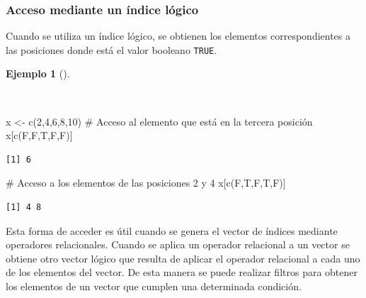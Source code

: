 \documentclass[
  a4paper,
]{scrreport}
\newenvironment{Shaded}{\begin{snugshade}}{\end{snugshade}}
\newcommand{\CommentTok}[1]{\textcolor[rgb]{0.37,0.37,0.37}{#1}}
\newcommand{\DecValTok}[1]{\textcolor[rgb]{0.68,0.00,0.00}{#1}}
\newcommand{\FunctionTok}[1]{\textcolor[rgb]{0.28,0.35,0.67}{#1}}
\newcommand{\NormalTok}[1]{\textcolor[rgb]{0.00,0.23,0.31}{#1}}
\newcommand{\OtherTok}[1]{\textcolor[rgb]{0.00,0.23,0.31}{#1}}
\theoremstyle{definition}
\theoremstyle{definition}
\newtheorem{example}{Ejemplo}[chapter]
\theoremstyle{remark}
\begin{document}
\hypertarget{acceso-mediante-un-uxedndice-luxf3gico}{%
\subsubsection{Acceso mediante un índice
lógico}\label{acceso-mediante-un-uxedndice-luxf3gico}}

Cuando se utiliza un índice lógico, se obtienen los elementos
correspondientes a las posiciones donde está el valor booleano
\texttt{TRUE}.

\begin{example}[]\protect\hypertarget{exm-acceso-vector-indice-logico}{}\label{exm-acceso-vector-indice-logico}

~

\begin{Shaded}
\begin{Highlighting}[]
\NormalTok{x }\OtherTok{\textless{}{-}} \FunctionTok{c}\NormalTok{(}\DecValTok{2}\NormalTok{,}\DecValTok{4}\NormalTok{,}\DecValTok{6}\NormalTok{,}\DecValTok{8}\NormalTok{,}\DecValTok{10}\NormalTok{)}
\CommentTok{\# Acceso al elemento que está en la tercera posición}
\NormalTok{x[}\FunctionTok{c}\NormalTok{(F,F,T,F,F)]}
\end{Highlighting}
\end{Shaded}

\begin{verbatim}
[1] 6
\end{verbatim}

\begin{Shaded}
\begin{Highlighting}[]
\CommentTok{\# Acceso a los elementos de las posiciones 2 y 4}
\NormalTok{x[}\FunctionTok{c}\NormalTok{(F,T,F,T,F)]}
\end{Highlighting}
\end{Shaded}

\begin{verbatim}
[1] 4 8
\end{verbatim}

\end{example}

Esta forma de acceder es útil cuando se genera el vector de índices
mediante operadores relacionales. Cuando se aplica un operador
relacional a un vector se obtiene otro vector lógico que resulta de
aplicar el operador relacional a cada uno de los elementos del vector.
De esta manera se puede realizar filtros para obtener los elementos de
un vector que cumplen una determinada condición.
\end{document}
